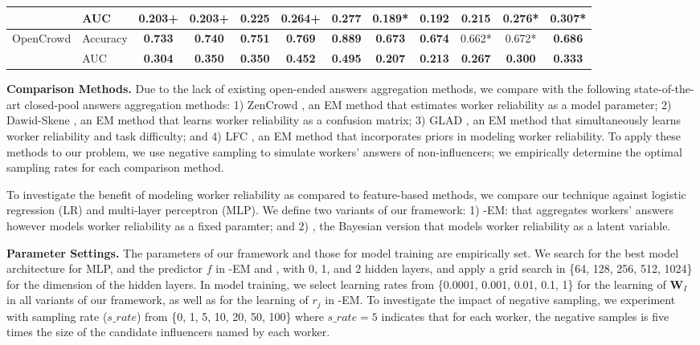 \begin{table*}[t]
\begin{tabular}{ll|ccccc|ccccc}
                             & AUC   & 0.203+         & 0.203+         & 0.225          & 0.264+         & 0.277          & 0.189*         & 0.192          & 0.215          & 0.276*         & 0.307*         \\ \hline
\multirow{2}{*}{OpenCrowd}   & Accuracy     & \textbf{0.733} & \textbf{0.740} & \textbf{0.751}         & \textbf{0.769} & \textbf{0.889}  & \textbf{0.673} & \textbf{0.674} & 0.662*         & 0.672*         & \textbf{0.686} \\ %
                             & AUC   & \textbf{0.304} & \textbf{0.350} & \textbf{0.350} & \textbf{0.452} & \textbf{0.495} & \textbf{0.207} & \textbf{0.213} & \textbf{0.267} & \textbf{0.300} & \textbf{0.333} \\ \bottomrule
\end{tabular}
 \label{sec:compres}  
\end{table*}

\smallskip
\noindent\textbf{Comparison Methods.} Due to the lack of existing open-ended answers aggregation methods, we compare with the following state-of-the-art closed-pool answers aggregation methods: 1) ZenCrowd \cite{demartini2012zencrowd}, an EM method that estimates worker reliability as a model parameter; 2) Dawid-Skene \cite{dawid1979maximum}, an EM method that learns worker reliability as a confusion matrix; 3) GLAD \cite{whitehill2009whose}, an EM method that simultaneously learns worker reliability and task difficulty; and 4) LFC \cite{raykar2010learning}, an EM method 
that incorporates priors in modeling worker reliability. To apply these methods to our problem, we use negative sampling to simulate workers' answers of non-influencers; we empirically determine the optimal sampling rates for each comparison method. 

To investigate the benefit of modeling worker reliability as compared to feature-based methods, we compare our technique against logistic regression (LR) and multi-layer perceptron (MLP). We define two variants of our framework: 1) \sys-EM: \sys that aggregates workers' answers however models worker reliability as a fixed paramter; and 2) \sys, the Bayesian version that models worker reliability as a latent variable.




\smallskip
\noindent\textbf{Parameter Settings.} The parameters of our framework and those for model training are empirically set. We search for the best model architecture for MLP, and the predictor $f$ in \sys-EM and \sys, with 0, 1, and 2 hidden layers, and apply a grid search in \{64, 128, 256, 512, 1024\} for the dimension of the hidden layers. In model training, we select learning rates from \{0.0001, 0.001, 0.01, 0.1, 1\} for the learning of $\mathbf{W}_I$ in all variants of our framework, as well as for the learning of $r_j$ in \sys-EM. To investigate the impact of negative sampling, we experiment with sampling rate ($s\_rate$) from \{0, 1, 5, 10, 20, 50, 100\}   where $s\_rate=5$ indicates that for each worker, the negative samples is five times the size of the candidate influencers named by each worker. 

